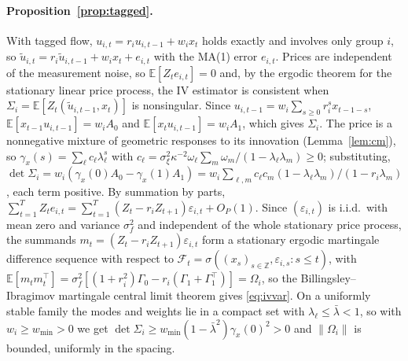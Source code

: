 \documentclass[12pt]{article}
\theoremstyle{definition}
\theoremstyle{remark}
\newcommand{\E}{\mathbb{E}}
\begin{document}
\paragraph{Proposition~\ref{prop:tagged}.} With tagged flow, $u_{i,t}=r_iu_{i,t-1}+w_ix_t$ holds exactly and involves only group $i$, so $\tilde u_{i,t}=r_i\tilde u_{i,t-1}+w_ix_t+e_{i,t}$ with the MA(1) error $e_{i,t}$. Prices are independent of the measurement noise, so $\E[Z_te_{i,t}]=0$ and, by the ergodic theorem for the stationary linear price process, the IV estimator is consistent when $\Sigma_i=\E[Z_t(\tilde u_{i,t-1},x_t)]$ is nonsingular. Since $u_{i,t-1}=w_i\sum_{s\ge0}r_i^sx_{t-1-s}$, $\E[x_{t-1}u_{i,t-1}]=w_iA_0$ and $\E[x_tu_{i,t-1}]=w_iA_1$, which gives $\Sigma_i$. The price is a nonnegative mixture of geometric responses to its innovation (Lemma~\ref{lem:cm}), so $\gamma_x(s)=\sum_\ell c_\ell\lambda_\ell^{s}$ with $c_\ell=\sigma_\xi^2\kappa^{-2}\omega_\ell\sum_m\omega_m/(1-\lambda_\ell\lambda_m)\ge0$; substituting, $\det\Sigma_i=w_i(\gamma_x(0)A_0-\gamma_x(1)A_1)=w_i\sum_{\ell,m}c_\ell c_m(1-\lambda_\ell\lambda_m)/(1-r_i\lambda_m)$, each term positive. By summation by parts, $\sum_{t=1}^TZ_te_{i,t}=\sum_{t=1}^T(Z_t-r_iZ_{t+1})\varepsilon_{i,t}+O_P(1)$. Since $(\varepsilon_{i,t})$ is i.i.d.\ with mean zero and variance $\sigma_f^2$ and independent of the whole stationary price process, the summands $m_t=(Z_t-r_iZ_{t+1})\varepsilon_{i,t}$ form a stationary ergodic martingale difference sequence with respect to $\mathcal F_t=\sigma((x_s)_{s\in\mathbb Z},\varepsilon_{i,s}:s\le t)$, with $\E[m_tm_t^\top]=\sigma_f^2[(1+r_i^2)\Gamma_0-r_i(\Gamma_1+\Gamma_1^\top)]=\Omega_i$, so the Billingsley--Ibragimov martingale central limit theorem gives \eqref{eq:ivvar}. On a uniformly stable family the modes and weights lie in a compact set with $\lambda_\ell\le\bar\lambda<1$, so with $w_i\ge w_{\min}>0$ we get $\det\Sigma_i\ge w_{\min}(1-\bar\lambda^2)\gamma_x(0)^2>0$ and $\|\Omega_i\|$ is bounded, uniformly in the spacing.
\end{document}
